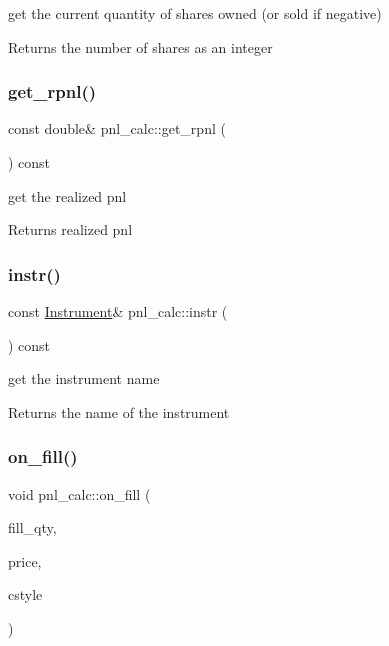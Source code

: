 get the current quantity of shares owned (or sold if negative) 

\begin{DoxyReturn}{Returns}
the number of shares as an integer 
\end{DoxyReturn}
\mbox{\label{classpnl__calc_aab99d78b9e204b9a35c559e2f21db16a}} 
\subsubsection{\texorpdfstring{get\+\_\+rpnl()}{get\_rpnl()}}
{\footnotesize\ttfamily const double\& pnl\+\_\+calc\+::get\+\_\+rpnl (\begin{DoxyParamCaption}{ }\end{DoxyParamCaption}) const}



get the realized pnl 

\begin{DoxyReturn}{Returns}
realized pnl 
\end{DoxyReturn}
\mbox{\label{classpnl__calc_a8fae6426142e1318162be3b8177b8e55}} 
\subsubsection{\texorpdfstring{instr()}{instr()}}
{\footnotesize\ttfamily const \hyperlink{classInstrument}{Instrument}\& pnl\+\_\+calc\+::instr (\begin{DoxyParamCaption}{ }\end{DoxyParamCaption}) const}



get the instrument name 

\begin{DoxyReturn}{Returns}
the name of the instrument 
\end{DoxyReturn}
\mbox{\label{classpnl__calc_a542abad6402d68f140eaecfd1bb845a2}} 
\subsubsection{\texorpdfstring{on\+\_\+fill()}{on\_fill()}}
{\footnotesize\ttfamily void pnl\+\_\+calc\+::on\+\_\+fill (\begin{DoxyParamCaption}\item[{const int \&}]{fill\+\_\+qty,  }\item[{const double \&}]{price,  }\item[{\hyperlink{pnl__calculator_8h_ad733a3c57302a7ac3408d55dc65f2681}{Commission\+Style}}]{cstyle }\end{DoxyParamCaption})}



